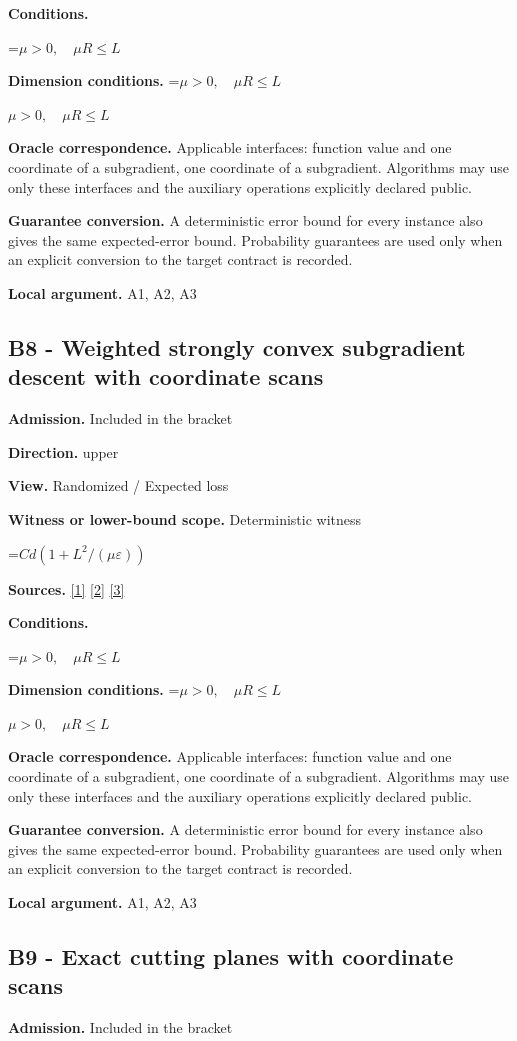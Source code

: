 \documentclass[10pt,a4paper]{article}
\newcommand{\AtlasMath}[1]{\par\begingroup\centering\setbox0=\hbox{$\displaystyle #1$}\ifdim\wd0>1.4\linewidth\typeout{ATLAS WIDE FORMULA: \the\wd0}\fi\ifdim\wd0>\linewidth\resizebox{\linewidth}{!}{\box0}\else\box0\fi\par\endgroup}
\newcommand{\AtlasInlineMath}[1]{\begingroup\setbox0=\hbox{$#1$}\ifdim\wd0>.4\linewidth\endgroup\AtlasMath{#1}\else\endgroup$#1$\fi}
\begin{document}
\textbf{Conditions.} 
\AtlasMath{\mu>0,\quad\mu R\le L}


\textbf{Dimension conditions.} \AtlasInlineMath{\mu>0,\quad\mu R\le L}

\textbf{Oracle correspondence.} Applicable interfaces: function value and one coordinate of a subgradient, one coordinate of a subgradient. Algorithms may use only these interfaces and the auxiliary operations explicitly declared public.

\textbf{Guarantee conversion.} A deterministic error bound for every instance also gives the same expected-error bound. Probability guarantees are used only when an explicit conversion to the target contract is recorded.

\textbf{Local argument.} A1, A2, A3

\subsection{B8 - Weighted strongly convex subgradient descent with coordinate scans}
\textbf{Admission.} Included in the bracket

\textbf{Direction.} upper

\textbf{View.} Randomized / Expected loss

\textbf{Witness or lower-bound scope.} Deterministic witness

\AtlasMath{Cd(1+L^2/(\mu\varepsilon))}
\textbf{Sources.} \href{https://arxiv.org/pdf/1405.4980}{[1]} \href{https://www2.isye.gatech.edu/~nemirovs/MOR_AccuracyCertificates.pdf}{[2]} \href{https://arxiv.org/pdf/2609.20701}{[3]}

\textbf{Conditions.} 
\AtlasMath{\mu>0,\quad\mu R\le L}


\textbf{Dimension conditions.} \AtlasInlineMath{\mu>0,\quad\mu R\le L}

\textbf{Oracle correspondence.} Applicable interfaces: function value and one coordinate of a subgradient, one coordinate of a subgradient. Algorithms may use only these interfaces and the auxiliary operations explicitly declared public.

\textbf{Guarantee conversion.} A deterministic error bound for every instance also gives the same expected-error bound. Probability guarantees are used only when an explicit conversion to the target contract is recorded.

\textbf{Local argument.} A1, A2, A3

\subsection{B9 - Exact cutting planes with coordinate scans}
\textbf{Admission.} Included in the bracket
\end{document}
